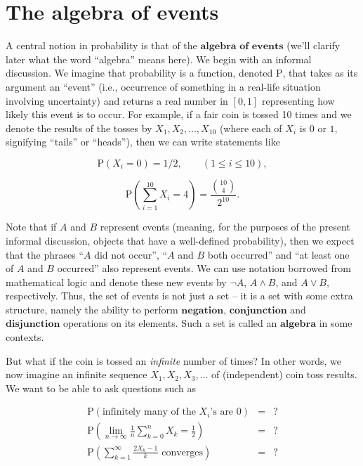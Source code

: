 \documentclass[11pt]{report}
\theoremstyle{plain}
\theoremstyle{definition}
\begin{document}
\section{The algebra of events}

A central notion in probability is that of the
$\textbf{algebra of events}$ (we'll clarify later
what the word ``algebra'' means here). We begin with
an informal discussion. We imagine that probability is
a function, denoted $\mathrm{P}$, that takes as its
argument an ``event'' (i.e., occurrence of something
in a real-life situation involving uncertainty) and
returns a real number in $[0,1]$ representing how
likely this event is to occur. For example, if a fair
coin is tossed 10 times and we denote the results of
the tosses by $X_1,X_2,\ldots,X_{10}$ (where each of
$X_i$ is $0$ or $1$, signifying ``tails'' or
``heads''), then we can write statements like

\[
\mathrm{P}(X_i = 0) = 1/2, \qquad (1\le i\le 10),
\]

\[
\mathrm{P}\left(\sum_{i=1}^{10} X_i = 4\right) = \frac{\binom{10}{4}}{2^{10}}.
\]

\noindent Note that if $A$ and $B$ represent events (meaning,
for the purposes of the present informal discussion,
objects that have a well-defined probability), then we
expect that the phrases ``$A$ did not occur'', ``$A$
and $B$ both occurred'' and ``at least one of $A$ and
$B$ occurred'' also represent events. We can use
notation borrowed from mathematical logic and denote
these new events by $\lnot A$, $A\wedge B$, and
$A \vee B$, respectively. Thus, the set of events is
not just a set -- it is a set with some extra
structure, namely the ability to perform
$\textbf{negation}$, $\textbf{conjunction}$ and
$\textbf{disjunction}$ operations on its elements.
Such a set is called an $\textbf{algebra}$ in some
contexts.

But what if the coin is tossed an \emph{infinite} number
of times? In other words, we now imagine an infinite
sequence $X_1,X_2,X_3,\ldots$ of (independent) coin
toss results. We want to be able to ask questions such
as

\begin{eqnarray*}
\mathrm{P}(\textrm{infinitely many of the $X_i$'s are 0}) &=& ? \\
\mathrm{P}\left(\lim_{n\to\infty} \frac{1}{n} \sum_{k=0}^n X_k = \frac12\right) &=& ? \\
\mathrm{P}\left(\sum_{k=1}^\infty \frac{2X_k-1}{k}\textrm{ converges}\right) &=& ?
\end{eqnarray*}
\end{document}
